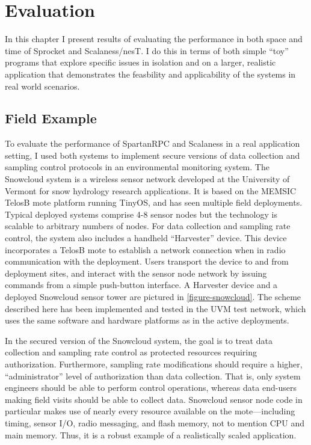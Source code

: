 
\chapter{Evaluation}
\label{chapter-evaluation}

In this chapter I present results of evaluating the performance in both space and time of
Sprocket and Scalaness/nesT. I do this in terms of both simple ``toy'' programs that explore
specific issues in isolation and on a larger, realistic application that demonstrates the
feasbility and applicability of the systems in real world scenarios.

\section{Field Example}

To evaluate the performance of SpartanRPC and Scalaness in a real application setting, I used
both systems to implement secure versions of data collection and sampling control protocols in
an environmental monitoring system. The Snowcloud system
\cite{frolik-skalka-snowcloudtr,moeser-walker-skalka-frolik-wsc11} is a wireless sensor network
developed at the University of Vermont for snow hydrology research applications. It is based on
the MEMSIC TelosB mote platform running TinyOS, and has seen multiple field deployments. Typical
deployed systems comprise 4-8 sensor nodes but the technology is scalable to arbitrary numbers
of nodes. For data collection and sampling rate control, the system also includes a handheld
``Harvester'' device. This device incorporates a TelosB mote to establish a network connection
when in radio communication with the deployment. Users transport the device to and from
deployment sites, and interact with the sensor node network by issuing commands from a simple
push-button interface. A Harvester device and a deployed Snowcloud sensor tower are pictured in
\autoref{figure-snowcloud}. The scheme described here has been implemented and tested in the UVM
test network, which uses the same software and hardware platforms as in the active deployments.

\snowcloudfig

In the secured version of the Snowcloud system, the goal is to treat data collection and
sampling rate control as protected resources requiring authorization. Furthermore, sampling rate
modifications should require a higher, ``administrator'' level of authorization than data
collection. That is, only system engineers should be able to perform control operations, whereas
data end-users making field visits should be able to collect data. Snowcloud sensor node code in
particular makes use of nearly every resource available on the mote---including timing, sensor
I/O, radio messaging, and flash memory, not to mention CPU and main memory. Thus, it is a robust
example of a realistically scaled application.

